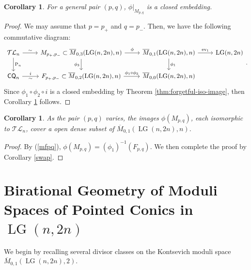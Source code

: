 \documentclass[10pt]{amsart}
\newtheorem{corollary}[theorem]{Corollary}
\theoremstyle{definition}
\newcommand{\Mbar}{\overline{M}}
\newcommand{\LG}{\operatorname{LG}}
\newcommand{\CQ}{\mathsf{CQ}}
\newcommand{\ev}{\operatorname{ev}}
\newcommand{\TL}{\mathcal{TL}}
\newcommand{\PL}{\mathrm{P}}
\theoremstyle{plain} %
\begin{document}
\begin{corollary}\label{prop:TLn-in-M01}
For a general pair $(p,q)$, $\phi|_{M_{p,q}}$
is a closed embedding.
\end{corollary}
\begin{proof}
We may assume that $p=p_+$ and $q=p_-$.
Then, we have the following commutative diagram:
\begin{equation}\label{mfpq}
\begin{tikzcd}
\TL_n\ar[d,"\PL_n"]\ar[r,"\sim"]& M_{p_+,p_-}\subset\overline{M}_{0,3}(\LG(n,2n),n) \ar[r, "\phi"] \ar[d, "\phi_3"'] 
& \Mbar_{0,1}(\LG(n,2n),n) \ar[d, "\phi_1"] \ar[r, "\ev_1"]
& \LG(n,2n) \\
\CQ_n\ar[r,"i","\sim"']&F_{p_+,p_-}\subset \overline{M}_{0,2}(\LG(n,2n),n) \ar[r, "\phi_1\circ\phi_2"]
& \Mbar_{0,0}(\LG(n,2n),n)
&
\end{tikzcd}.    
\end{equation}
Since $\phi_1\circ\phi_2\circ i$ is a closed embedding by Theorem \ref{thm:forgetful-iso-image}, then Corollary \ref{prop:TLn-in-M01} follows.
\end{proof}


\begin{corollary}\label{rem:TLn-covers-dense-open-in-M01}
As the pair $(p,q)$ varies, the images $\phi(M_{p,q})$, each isomorphic to $\TL_n$, cover a open dense subset of $\Mbar_{0,1}(\LG(n,2n),n)$.
\end{corollary}
\begin{proof}
By (\ref{mfpq}), $\phi(M_{p,q})=(\phi_1)^{-1}(F_{p,q})$. We then complete the proof by Corollary \ref{swap}.   
\end{proof}

\section{Birational Geometry of Moduli Spaces of Pointed Conics in \texorpdfstring{$\LG(n,2n)$}{LG(n,2n)}}\label{Sec4}

We begin by recalling several divisor classes on the Kontsevich moduli space $\overline{M}_{0,1}(\LG(n,2n),2)$. 
\end{document}
